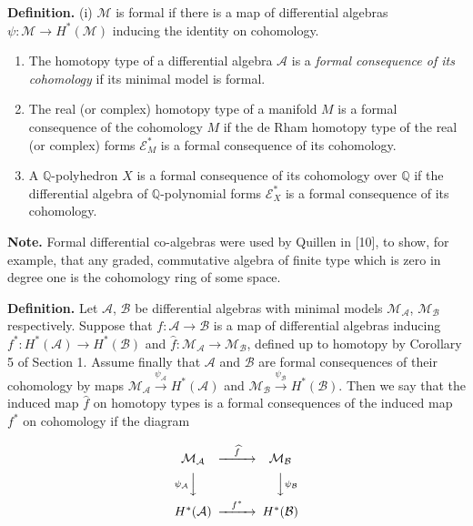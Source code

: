 \documentclass[
  english,
  a3paper,
  a3paper]{extarticle}
\begin{document}
\textbf{Definition.} (i) \(\mathcal M\) is formal if there is a map of
differential algebras \(\psi:\mathcal M\to H^*(\mathcal M)\) inducing
the identity on cohomology.

\begin{enumerate}
\def\labelenumi{(\roman{enumi})}
\setcounter{enumi}{1}
\item
  The homotopy type of a differential algebra \(\mathcal A\) is a
  \emph{formal consequence of its cohomology} if its minimal model is
  formal.
\item
  The real (or complex) homotopy type of a manifold \(M\) is a formal
  consequence of the cohomology \(M\) if the de Rham homotopy type of
  the real (or complex) forms \(\mathcal E_M^*\) is a formal consequence
  of its cohomology.
\item
  A \(\mathbb Q\)-polyhedron \(X\) is a formal consequence of its
  cohomology over \(\mathbb Q\) if the differential algebra of
  \(\mathbb Q\)-polynomial forms \(\mathcal E_X^*\) is a formal
  consequence of its cohomology.
\end{enumerate}

\textbf{Note.} Formal differential co-algebras were used by Quillen in
{[}10{]}, to show, for example, that any graded, commutative algebra of
finite type which is zero in degree one is the cohomology ring of some
space.

\textbf{Definition.} Let \(\mathcal A\), \(\mathcal B\) be differential
algebras with minimal models \(\mathcal M_{\mathcal A}\),
\(\mathcal M_{\mathcal B}\) respectively. Suppose that
\(f:\mathcal A\to\mathcal B\) is a map of differential algebras inducing
\(f^*:H^*(\mathcal A)\to H^*(\mathcal B)\) and
\(\widehat f:\mathcal M_{\mathcal A}\to\mathcal M_{\mathcal B}\),
defined up to homotopy by Corollary 5 of Section 1. Assume finally that
\(\mathcal A\) and \(\mathcal B\) are formal consequences of their
cohomology by maps
\(\mathcal M_{\mathcal A}\xrightarrow{\psi_{\mathcal A}}H^*(\mathcal A)\)
and
\(\mathcal M_{\mathcal B}\xrightarrow{\psi_{\mathcal B}}H^*(\mathcal B)\).
Then we say that the induced map \(\widehat f\) on homotopy types is a
formal consequences of the induced map \(f^*\) on cohomology if the
diagram

\[\begin{CD}\mathcal M_{\mathcal A}@>{\widehat f}>>\mathcal M_{\mathcal B}\\@V{\psi_{\mathcal A}}VV@VV{\psi_{\mathcal B}}V\\H^*(\mathcal A)@>{f^*}>>H^*(\mathcal B)\end{CD}\]
\end{document}

